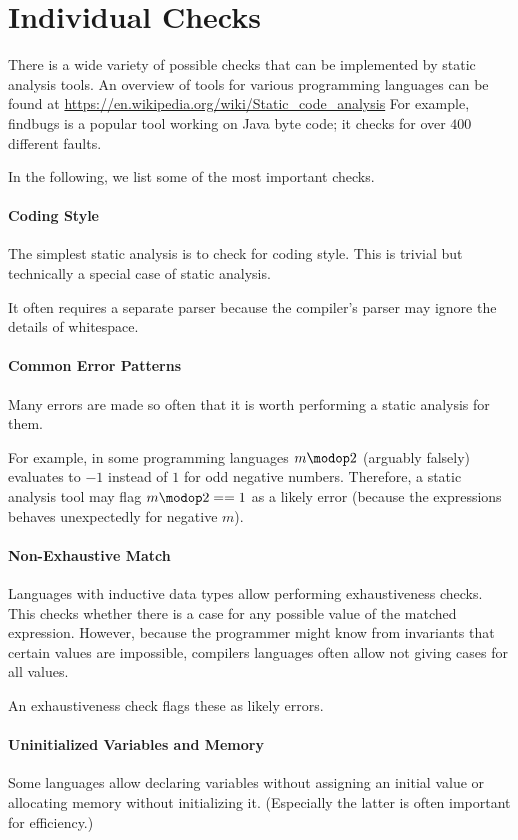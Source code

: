 \section{Individual Checks}

There is a wide variety of possible checks that can be implemented by static analysis tools.
An overview of tools for various programming languages can be found at \url{https://en.wikipedia.org/wiki/Static_code_analysis}
For example, findbugs is a popular tool working on Java byte code; it checks for over $400$ different faults.

In the following, we list some of the most important checks.

\paragraph{Coding Style}
The simplest static analysis is to check for coding style.
This is trivial but technically a special case of static analysis.

It often requires a separate parser because the compiler's parser may ignore the details of whitespace.

\paragraph{Common Error Patterns}
Many errors are made so often that it is worth performing a static analysis for them.

For example, in some programming languages $m\modop 2$ (arguably falsely) evaluates to $-1$ instead of $1$ for odd negative numbers.
Therefore, a static analysis tool may flag $m\modop 2==1$ as a likely error (because the expressions behaves unexpectedly for negative $m$).

\paragraph{Non-Exhaustive Match}
Languages with inductive data types allow performing exhaustiveness checks.
This checks whether there is a case for any possible value of the matched expression.
However, because the programmer might know from invariants that certain values are impossible, compilers languages often allow not giving cases for all values.

An exhaustiveness check flags these as likely errors.

\paragraph{Uninitialized Variables and Memory}
Some languages allow declaring variables without assigning an initial value or allocating memory without initializing it.
(Especially the latter is often important for efficiency.)

